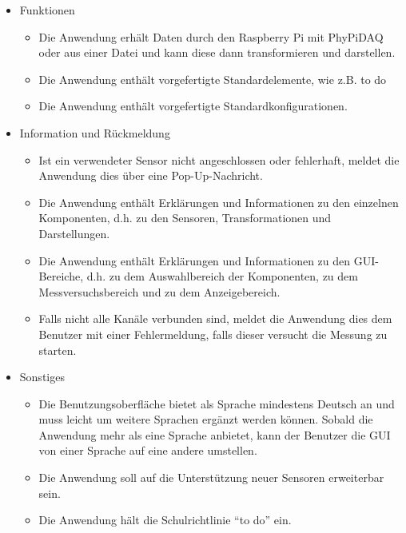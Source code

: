 \documentclass[parskip=full]{scrartcl}
\begin{document}
\begin{itemize}
\item Funktionen
\begin{itemize}

\item Die Anwendung erhält Daten durch den Raspberry Pi mit PhyPiDAQ oder aus einer Datei und kann diese dann transformieren und darstellen.
\item Die Anwendung enthält vorgefertigte Standardelemente, wie z.B. to do
\item Die Anwendung enthält vorgefertigte Standardkonfigurationen.

\end{itemize}

\item Information und Rückmeldung
\begin{itemize}

\item Ist ein verwendeter Sensor nicht angeschlossen oder fehlerhaft, meldet die Anwendung dies über eine Pop-Up-Nachricht.
\item Die Anwendung enthält Erklärungen und Informationen zu den einzelnen Komponenten, d.h. zu den Sensoren, Transformationen und Darstellungen.
\item Die Anwendung enthält Erklärungen und Informationen zu den GUI-Bereiche, d.h. zu dem Auswahlbereich der Komponenten, zu dem Messversuchsbereich und zu dem Anzeigebereich.
\item Falls nicht alle Kanäle verbunden sind, meldet die Anwendung dies dem Benutzer mit einer Fehlermeldung, falls dieser versucht die Messung zu starten. 

\end{itemize}

\item Sonstiges
\begin{itemize}

\item Die Benutzungsoberfläche bietet als Sprache mindestens Deutsch an und muss leicht um weitere Sprachen ergänzt werden können. Sobald die Anwendung mehr als eine Sprache anbietet, kann der Benutzer die GUI von einer Sprache auf eine andere umstellen.
\item Die Anwendung soll auf die Unterstützung neuer Sensoren erweiterbar sein.
\item Die Anwendung hält die Schulrichtlinie "`to do"' ein.

\end{itemize}

 \end{itemize}
\end{document}
